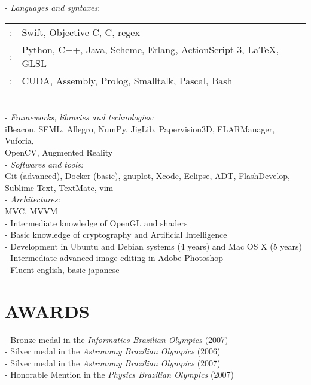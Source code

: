 \documentclass[]{res} %
\def \divspace{6pt}
\begin{document}
\begin{resume}
- {\sl Languages and syntaxes}: \\
\setlength\tabcolsep{2pt}
\begin{tabular}{r l}
\hspace*{1.5em}{\sl Fluent}:& Swift, Objective-C, C, regex \\
\hspace*{1.5em}{\sl More Familiar}:& Python, C++, Java, Scheme, Erlang, ActionScript 3, \LaTeX, GLSL \\
\hspace*{1.5em}{\sl Less Familiar}:& CUDA, Assembly, Prolog, Smalltalk, Pascal, Bash \\
\end{tabular}
\\
- {\sl Frameworks, libraries and technologies:} \\
\hspace*{1.5em}iBeacon, SFML, Allegro, NumPy, JigLib, Papervision3D, FLARManager, Vuforia, \\
\hspace*{1.5em}OpenCV, Augmented Reality
\\
- {\sl Softwares and tools:} \\
\hspace*{1.5em}Git (advanced), Docker (basic), gnuplot, Xcode, Eclipse, ADT, FlashDevelop, Sublime Text, TextMate, vim
\\
- {\sl Architectures:} \\
\hspace*{1.5em}MVC, MVVM
\\
- Intermediate knowledge of OpenGL and shaders \\
- Basic knowledge of cryptography and Artificial Intelligence \\
- Development in Ubuntu and Debian systems (4 years) and Mac OS X (5 years) \\
- Intermediate-advanced image editing in Adobe Photoshop \\
- Fluent english, basic japanese


\section{AWARDS \hspace{\divspace} }

- Bronze medal in the {\sl Informatics Brazilian Olympics} (2007) \\
- Silver medal in the {\sl Astronomy Brazilian Olympics} (2006) \\
- Silver medal in the {\sl Astronomy Brazilian Olympics} (2007) \\
- Honorable Mention in the {\sl Physics Brazilian Olympics} (2007) \\


\end{resume}
\end{document}
